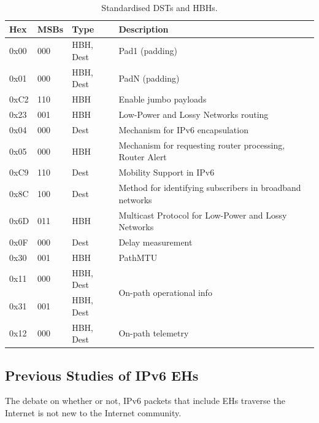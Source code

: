\documentclass[conference]{IEEEtran}
\begin{document}
\begin{table}[b]
\center
\caption{Standardised DSTs and HBHs.}
\begin{tabular}{p{}|p{}|l|p{}}
Hex  & MSBs & Type      & Description                                              \\
\hline
\hline
0x00 & 000  & HBH, Dest & Pad1 (padding)                                           \\
0x01 & 000  & HBH, Dest & PadN (padding)                                           \\
0xC2 & 110  & HBH       & Enable jumbo payloads                                    \\
0x23 & 001  & HBH       & Low-Power and Lossy Networks routing                     \\
0x04 & 000  & Dest      & Mechanism for IPv6 encapsulation                 \\
0x05 & 000  & HBH       & Mechanism for requesting router processing, Router Alert              \\
0xC9 & 110  & Dest      & Mobility Support in IPv6                                 \\
0x8C & 100  & Dest      & Method for identifying subscribers in broadband networks \\
0x6D & 011  & HBH       & Multicast Protocol for Low-Power and  Lossy Networks     \\
0x0F & 000  & Dest      & Delay measurement                                        \\
0x30 & 001  & HBH       & PathMTU                                     \\
0x11 & 000  & HBH, Dest & \multirow{2}{*}{On-path operational info}                \\
0x31 & 001  & HBH, Dest &                                                          \\
0x12 & 000  & HBH, Dest & On-path telemetry                                       
\end{tabular}
  \label{tbl:options}
\end{table}


\subsection{Previous Studies of IPv6 EHs}

\label{sec:motivation}

The debate on whether or not, IPv6 packets that include EHs traverse the Internet is not new to the Internet community.
\end{document}
